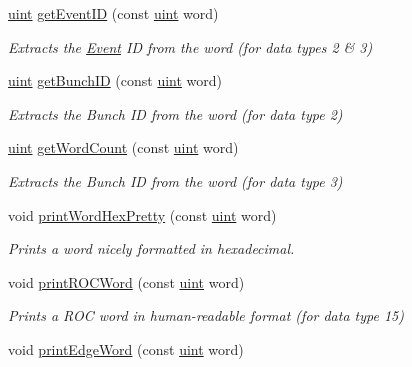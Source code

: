\begin{DoxyCompactItemize}
\hyperlink{namespacebindec_a61700e6ffcfc677215bfdf223803e735}{uint} \hyperlink{namespacebindec_a7164db2f87d4d2cfa12b2cd147d2402d}{get\+Event\+ID} (const \hyperlink{namespacebindec_a61700e6ffcfc677215bfdf223803e735}{uint} word)
\begin{DoxyCompactList}\small\item\em Extracts the \hyperlink{class_event}{Event} ID from the word (for data types 2 \& 3) \end{DoxyCompactList}\item 
\hyperlink{namespacebindec_a61700e6ffcfc677215bfdf223803e735}{uint} \hyperlink{namespacebindec_ad029aeb7b485d578e5f3ce91a9cf85f6}{get\+Bunch\+ID} (const \hyperlink{namespacebindec_a61700e6ffcfc677215bfdf223803e735}{uint} word)
\begin{DoxyCompactList}\small\item\em Extracts the Bunch ID from the word (for data type 2) \end{DoxyCompactList}\item 
\hyperlink{namespacebindec_a61700e6ffcfc677215bfdf223803e735}{uint} \hyperlink{namespacebindec_a41cf9d8a7714d845128193f21a9e8947}{get\+Word\+Count} (const \hyperlink{namespacebindec_a61700e6ffcfc677215bfdf223803e735}{uint} word)
\begin{DoxyCompactList}\small\item\em Extracts the Bunch ID from the word (for data type 3) \end{DoxyCompactList}\item 
void \hyperlink{namespacebindec_afaac14016b1f153ac47aec62509d14db}{print\+Word\+Hex\+Pretty} (const \hyperlink{namespacebindec_a61700e6ffcfc677215bfdf223803e735}{uint} word)
\begin{DoxyCompactList}\small\item\em Prints a word nicely formatted in hexadecimal. \end{DoxyCompactList}\item 
void \hyperlink{namespacebindec_ae47ffd422cb9936f6dfca77bc7c969cb}{print\+R\+O\+C\+Word} (const \hyperlink{namespacebindec_a61700e6ffcfc677215bfdf223803e735}{uint} word)
\begin{DoxyCompactList}\small\item\em Prints a R\+OC word in human-\/readable format (for data type 15) \end{DoxyCompactList}\item 
void \hyperlink{namespacebindec_a54d919f57f0eaa9df57df4b0ad8cdfc6}{print\+Edge\+Word} (const \hyperlink{namespacebindec_a61700e6ffcfc677215bfdf223803e735}{uint} word)

\end{DoxyCompactItemize}
